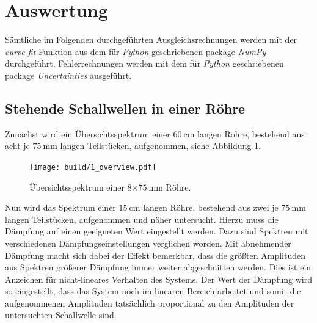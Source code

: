 \section{Auswertung}
\label{sec:Auswertung}
Sämtliche im Folgenden durchgeführten Ausgleichsrechnungen werden mit der \emph{curve fit} Funktion aus dem für \emph{Python} geschriebenen package \emph{NumPy}\cite{scipy} durchgeführt. Fehlerrechnungen werden mit dem für \emph{Python} geschriebenen package \emph{Uncertainties}\cite{uncertainties} ausgeführt.

\subsection{Stehende Schallwellen in einer Röhre}
\label{sec:Ausw1}
Zunächst wird ein Übersichtsspektrum einer $\SI{60}{\centi\meter}$ langen Röhre, bestehend aus acht je $\SI{75}{\milli\meter}$ langen Teilstücken, aufgenommen, siehe Abbildung \ref{fig:1_1}.
\begin{figure}
  \centering
  \texttt{[image: build/1\_overview.pdf]}
  \caption{Übersichtsspektrum einer 8$\times\SI{75}{\milli\meter}$ Röhre.}
  \label{fig:1_1}
\end{figure}
Nun wird das Spektrum einer $\SI{15}{\centi\meter}$ langen Röhre, bestehend aus zwei je $\SI{75}{\milli\meter}$ langen Teilstücken, aufgenommen und näher untersucht. Hierzu muss die Dämpfung auf einen geeigneten Wert eingestellt werden. Dazu sind Spektren mit verschiedenen Dämpfungseinstellungen verglichen worden. Mit abnehmender Dämpfung macht sich dabei der Effekt bemerkbar, dass die größten Amplituden aus Spektren größerer Dämpfung immer weiter abgeschnitten werden. Dies ist ein Anzeichen für nicht-lineares Verhalten des Systems. Der Wert der Dämpfung wird so eingestellt, dass das System noch im linearen Bereich arbeitet und somit die aufgenommenen Amplituden tatsächlich proportional zu den Amplituden der untersuchten Schallwelle sind.

